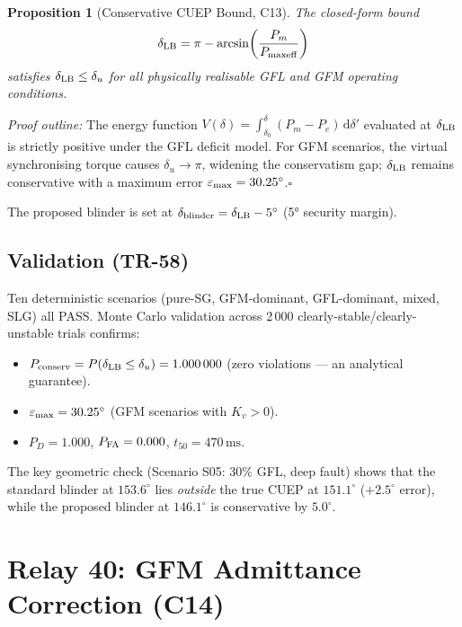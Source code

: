 \documentclass[journal,twoside]{IEEEtran}
\newtheorem{proposition}{Proposition}
\begin{document}
\begin{proposition}[Conservative CUEP Bound, C13]
\label{prop:cuep}
The closed-form bound
\begin{equation}
  \delta_{\rm LB} = \pi - \arcsin\!\left(\frac{P_m}{P_{\rm maxeff}}\right)
  \label{eq:delta_lb}
\end{equation}
satisfies $\delta_{\rm LB} \leq \delta_u$ for all physically realisable GFL
and GFM operating conditions.
\end{proposition}

\noindent\textit{Proof outline:} The energy function
$V(\delta) = \int_{\delta_0}^{\delta}(P_m - P_e)\,\mathrm{d}\delta'$
evaluated at $\delta_{\rm LB}$ is strictly positive under the GFL deficit
model.
For GFM scenarios, the virtual synchronising torque causes $\delta_u \to \pi$,
widening the conservatism gap; $\delta_{\rm LB}$ remains conservative with a
maximum error $\varepsilon_{\rm max} = 30.25^\circ$.\hfill$\square$

The proposed blinder is set at
$\delta_{\rm blinder} = \delta_{\rm LB} - 5^\circ$ (5° security margin).

\subsection{Validation (TR-58)}

Ten deterministic scenarios (pure-SG, GFM-dominant, GFL-dominant, mixed, SLG)
all PASS.
Monte Carlo validation across 2\,000 clearly-stable/clearly-unstable trials
confirms:
\begin{itemize}
  \item $P_{\rm conserv} = P(\delta_{\rm LB} \leq \delta_u) = 1.000\,000$
        (zero violations --- an analytical guarantee).
  \item $\varepsilon_{\rm max} = 30.25^\circ$ (GFM scenarios with $K_v > 0$).
  \item $P_D = 1.000$,\; $P_{\rm FA} = 0.000$,\; $t_{50} = 470\,\text{ms}$.
\end{itemize}
The key geometric check (Scenario S05: 30\% GFL, deep fault) shows that the
standard blinder at $153.6^\circ$ lies \emph{outside} the true CUEP at
$151.1^\circ$ ($+2.5^\circ$ error), while the proposed blinder at $146.1^\circ$
is conservative by $5.0^\circ$.

\section{Relay 40: GFM Admittance Correction (C14)}
\label{sec:relay40}
\end{document}
